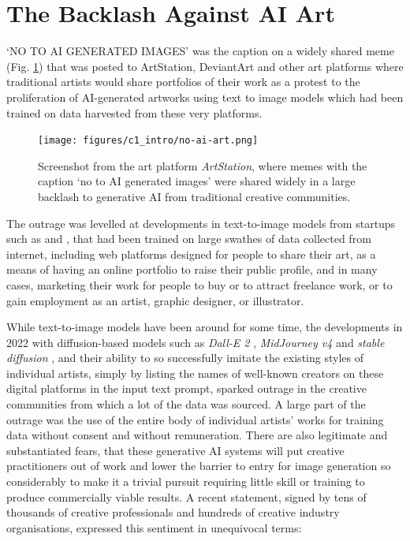 \section{The Backlash Against AI Art}

`NO TO AI GENERATED IMAGES' was the caption on a widely shared meme  (Fig. \ref{fig:c1:no-ai-art}) that was posted to ArtStation, DeviantArt and other art platforms where traditional artists would share portfolios of their work as a protest to the proliferation of AI-generated artworks using text to image models which had been trained on data harvested from these very platforms. 

\begin{figure}[!htb]
    \centering
    \captionsetup{justification=centering}
    \texttt{[image: figures/c1\_intro/no-ai-art.png]}
    \caption['No-AI memes being shared on the platform ArtStation]{Screenshot from the art platform \textit{ArtStation}, where memes with the caption `no to AI generated images' were shared widely in a large backlash to generative AI from traditional creative communities.}
    \label{fig:c1:no-ai-art}
\end{figure}

The outrage was levelled at developments in text-to-image models from startups such as \cite{midjourney2023midjourney} and \cite{stability2023stability}, that had been trained on large swathes of data collected from internet, including web platforms designed for people to share their art, as a means of having an online portfolio to raise their public profile, and in many cases, marketing their work for people to buy or to attract freelance work, or to gain employment as an artist, graphic designer, or illustrator.

While text-to-image models have been around for some time, the developments in 2022 with diffusion-based models such as \textit{Dall-E 2} \citep{openai2022dalle2}, \textit{MidJourney v4} \citep{edwards2022midjourney} and \textit{stable diffusion} \citep{stability2022stable}, and their ability to so successfully imitate the existing styles of individual artists, simply by listing the names of well-known creators on these digital platforms in the input text prompt, sparked outrage in the creative communities from which a lot of the data was sourced. 
A large part of the outrage was the use of the entire body of individual artists' works for training data without consent and without remuneration.
There are also legitimate and substantiated fears, that these generative AI systems will put creative practitioners out of work and lower the barrier to entry for image generation so considerably to make it a trivial pursuit requiring little skill or training to produce commercially viable results.
A recent statement, signed by tens of thousands of creative professionals and hundreds of creative industry organisations, expressed this sentiment in unequivocal terms:

